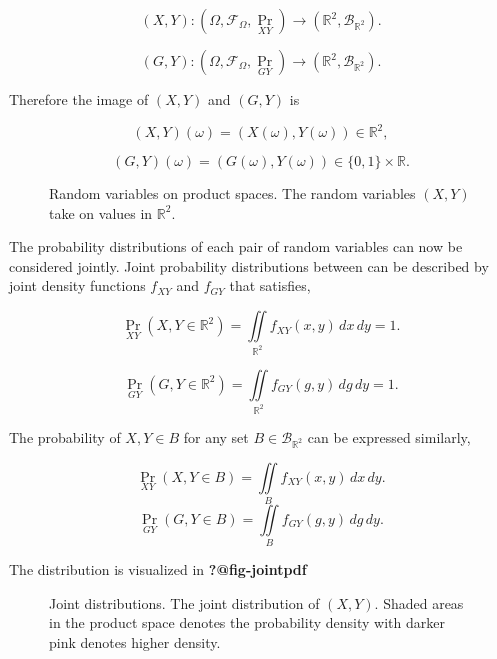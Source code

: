 \documentclass[
  letterpaper,
  DIV=11,
  numbers=noendperiod]{scrreprt}
\begin{document}
\[
(X,Y) : (\Omega, \mathcal{F}_{\Omega},{\Pr}_{XY}) \rightarrow  (\mathbb{R}^2,\mathcal{B}_{\mathbb{R}^2}).
\]

\[
(G,Y) : (\Omega, \mathcal{F}_{\Omega},{\Pr}_{GY}) \rightarrow  (\mathbb{R}^2,\mathcal{B}_{\mathbb{R}^2}).
\]

Therefore the image of \((X,Y)\) and \((G,Y)\) is

\[
(X,Y)(\omega) = (X(\omega),Y(\omega)) \in \mathbb{R}^2,
\]

\[
(G,Y)(\omega) = (G(\omega),Y(\omega)) \in \{0,1\}\times\mathbb{R}.
\]

\begin{figure}[H]


\caption{\label{fig-biv-rv}Random variables on product spaces. The
random variables \((X,Y)\) take on values in \(\mathbb{R}^2\).}

\end{figure}%

The probability distributions of each pair of random variables can now
be considered jointly. Joint probability distributions between can be
described by joint density functions \(f_{XY}\) and \(f_{GY}\) that
satisfies,

\[
{\Pr}_{XY}(X,Y \in \mathbb{R}^2) = \iint\limits_{\mathbb{R}^2} f_{XY}(x,y) \,dx \, dy  = 1.
\]

\[
{\Pr}_{GY}(G,Y \in \mathbb{R}^2) = \iint\limits_{\mathbb{R}^2} f_{GY}(g,y) \,dg \, dy  = 1.
\]

The probability of \(X,Y\in B\) for any set
\(B\in\mathcal{B}_{\mathbb{R}^2}\) can be expressed similarly,

\[
{\Pr}_{XY}(X,Y \in B) = \iint\limits_{B} f_{XY}(x,y) \,dx \, dy.
\] \[
{\Pr}_{GY}(G,Y \in B) = \iint\limits_{B} f_{GY}(g,y) \,dg \, dy.
\]

The distribution is visualized in \textbf{?@fig-jointpdf}

\begin{figure}[H]


\caption{\label{fig-joint-pdf}Joint distributions. The joint
distribution of \((X,Y)\). Shaded areas in the product space denotes the
probability density with darker pink denotes higher density.}

\end{figure}%
\end{document}
